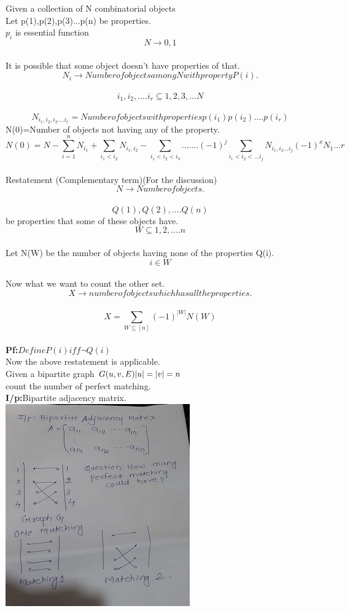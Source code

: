 Given a collection of N combinatorial objects \\
Let p(1),p(2),p(3)...p(n) be properties.\\
$p_i$ is essential function \\
$$ N \to {0,1}   $$\\
It is possible that some object doesn't have properties of that.\\
$$N_i \to Number of objects among N with property P(i).$$\\
$$ {i_1,i_2,....i_r} \subseteq {1,2,3,...N} $$\\
$$N_{i_1,i_2,i_3....i_r} = Number of objects with properties p(i_1) p(i_2)....p(i_r) $$
N(0)=Number of objects not having any of the property.\\
$$ N(0)=N-\sum_{i=1}^{n} N_{i_1} +\sum_{i_1<i_2}N_{i_1,i_2} -\sum_{i_1 < i_2 <i_3}.......(-1)^{j} \sum_{i_1<i_2<...i_j}N_{i_1,i_2...i_j} (-1)^{x}N_1...r   $$\\
Restatement (Complementary term)(For the discussion)\\
$$N \to Number of objects.$$\\
$$Q(1),Q(2),....Q(n) $$be properties that some of these objects have.\\
$$W \subseteq {1,2,....n}  $$\\
Let N(W) be the number of objects having none of the properties Q(i).\\
$$i \in W   $$\\
Now what we want to count the other set.\\
$$X \to number of objects which has all the properties.$$\\
$$X = \sum_{W \subseteq [n]}(-1)^{|W|} N(W)   $$\\
\textbf{Pf:}$Define P(i) iff \neg Q(i)$\\
Now the above restatement is applicable.\\
Given a bipartite graph $G(u,v,E)\\
  |u|=|v|=n $\\
count the number of perfect matching.\\
\textbf{I/p:}Bipartite adjacency matrix.\\
\includegraphics{images/graph.jpg}\\ \\
